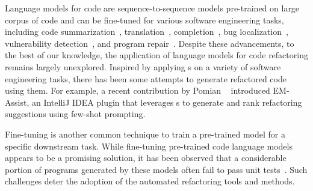 Language models for code are sequence-to-sequence models pre-trained on large corpus of code
and can be fine-tuned for various software engineering tasks, including code summarization~\cite{ahmed2022few, sun2024source}, translation~\cite{eniser2024towards, yin2024rectifier}, completion~\cite{bairi2024codeplan, eghbali2024hallucinator}, bug localization~\cite{yang2024large}, vulnerability detection~\cite{lu2024grace, zhou2024large}, and program repair~\cite{Sharma2024}.
Despite these advancements,
to the best of our knowledge, 
the application of language models for code refactoring remains largely unexplored. 
Inspired by applying \llmsc{}s on a variety of software engineering tasks, there has been some attempts to generate refactored code using them.
For example, a recent contribution by Pomian \etal{}~\cite{Pomian2024} introduced EM-Assist, an IntelliJ IDEA plugin that leverages \llmsc{}s to generate and rank refactoring suggestions using few-shot prompting. 

Fine-tuning is another common technique to train a pre-trained model for a specific downstream task.
While fine-tuning pre-trained code language models appears to be a promising solution, it has been observed that a considerable portion of programs generated by these models often fail to pass unit tests~\cite{chen2021evaluating, li2022competition, jha2023codeattack}.
Such challenges deter the adoption of the automated refactoring tools and methods.

